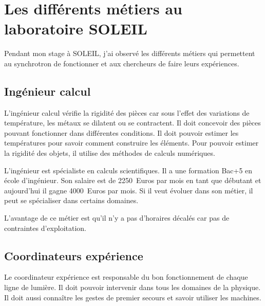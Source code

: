 
\chapter{Les différents métiers au laboratoire SOLEIL}
	\minitoc
	




			
	

		Pendant mon stage à SOLEIL, j'ai observé les différents métiers qui permettent au synchrotron de fonctionner et aux chercheurs de faire leurs expériences.			

		\section{Ingénieur calcul}
			L'ingénieur calcul vérifie la rigidité des pièces car sous l'effet des variations de température, les métaux se dilatent ou se contractent. Il doit concevoir des pièces pouvant fonctionner dans différentes conditions. Il doit pouvoir estimer les températures pour savoir comment construire les éléments. Pour pouvoir estimer la rigidité des objets, il utilise des méthodes de calculs numériques.
			
			L'ingénieur est spécialiste en calculs scientifiques. Il a une formation Bac+5 en école d'ingénieur. Son salaire est de 2250~Euros par mois en tant que débutant et aujourd'hui il gagne 4000~Euros par mois. Si il veut évoluer dans son métier, il peut se spécialiser dans certains domaines.
			
			L'avantage de ce métier est qu'il n'y a pas d'horaires décalés car pas de contraintes d'exploitation.  
		
		\section{Coordinateurs expérience}
			Le coordinateur expérience est responsable du bon fonctionnement de chaque ligne de lumière. Il doit pouvoir intervenir dans tous les domaines de la physique. Il doit aussi connaître les gestes de premier secours et savoir utiliser les machines.
			
